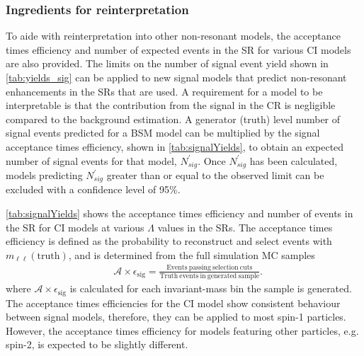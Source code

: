 \subsubsection{Ingredients for reinterpretation}\label{sec:results:reinterp}
To aide with reinterpretation into other non-resonant models, the acceptance times efficiency and number of expected events in the SR for various CI models are also provided. The limits on the number of signal event yield shown in \cref{tab:yields_sig} can be applied to new signal models that predict non-resonant enhancements in the SRs that are used. A requirement for a model to be interpretable is that the contribution from the signal in the CR is negligible compared to the background estimation. A generator (truth) level number of signal events predicted for a BSM model can be multiplied by the signal acceptance times efficiency, shown in \cref{tab:signalYields}, to obtain an expected number of signal events for that model, $N_{sig}^\prime$. Once $N_{sig}^\prime$ has been calculated, models predicting $N_{sig}^\prime$ greater than or equal to the observed limit can be excluded with a confidence level of 95\%.

\cref{tab:signalYields} shows the acceptance times efficiency and number of events in the SR for CI models at various $\Lambda$ values in the SRs. The acceptance times efficiency is defined as the probability to reconstruct and select events with $m_{\ell\ell}(\mathrm{truth})$, and is determined from the full simulation MC samples
\begin{equation}
    \label{eq:atimee}
    \begin{aligned}
        & \mathcal{A}\times\epsilon_\textrm{sig} = \frac{\mathrm{Events~passing~selection~cuts}}{\mathrm{Truth~events~in~generated~sample}}.
    \end{aligned}
\end{equation}
where $\mathcal{A}\times\epsilon_\textrm{sig}$ is calculated for each invariant-mass bin the sample is generated. The acceptance times efficiencies for the CI model show consistent behaviour between signal models, therefore, they can be applied to most spin-1 particles. However, the acceptance times efficiency for models featuring other particles, e.g. spin-2, is expected to be slightly different. 

